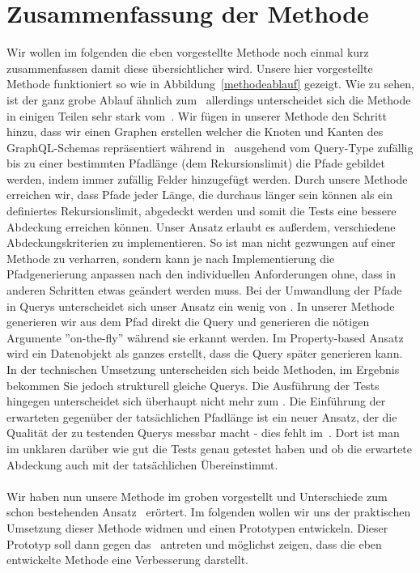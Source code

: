 \section{Zusammenfassung der Methode}

Wir wollen im folgenden die eben vorgestellte Methode noch einmal kurz zusammenfassen damit diese übersichtlicher wird.
Unsere hier vorgestellte Methode funktioniert so wie in Abbildung~\ref{methodeablauf} gezeigt.
Wie zu sehen, ist der ganz grobe Ablauf ähnlich zum~\cite[Property-based Testing]{property-based-testing} allerdings unterscheidet sich die
Methode in einigen Teilen sehr stark vom~\cite[Property-based Testing]{property-based-testing}.
Wir fügen in unserer Methode den Schritt hinzu, dass wir einen Graphen erstellen welcher die Knoten und Kanten des GraphQL-Schemas repräsentiert
während in~\cite[Property-based Testing]{property-based-testing} ausgehend vom Query-Type zufällig bis zu einer bestimmten Pfadlänge (dem Rekursionslimit)
die Pfade gebildet werden, indem immer zufällig Felder hinzugefügt werden.
Durch unsere Methode erreichen wir, dass Pfade jeder Länge, die durchaus länger sein können als ein definiertes Rekursionslimit, abgedeckt werden und
somit die Tests eine bessere Abdeckung erreichen können.
Unser Ansatz erlaubt es außerdem, verschiedene Abdeckungskriterien zu implementieren.
So ist man nicht gezwungen auf einer Methode zu verharren, sondern kann je nach Implementierung die Pfadgenerierung anpassen nach den individuellen
Anforderungen ohne, dass in anderen Schritten etwas geändert werden muss.
Bei der Umwandlung der Pfade in Querys unterscheidet sich unser Ansatz ein wenig von \cite[Property-based Testing]{property-based-testing}.
In unserer Methode generieren wir aus dem Pfad direkt die Query und generieren die nötigen Argumente ''on-the-fly'' während sie erkannt werden.
Im Property-based Ansatz wird ein Datenobjekt als ganzes erstellt, dass die Query später generieren kann.
In der technischen Umsetzung unterscheiden sich beide Methoden, im Ergebnis bekommen Sie jedoch strukturell gleiche Querys.
Die Ausführung der Tests hingegen unterscheidet sich überhaupt nicht mehr zum \cite[Property-based Testing]{property-based-testing}.
Die Einführung der erwarteten gegenüber der tatsächlichen Pfadlänge ist ein neuer Ansatz, der die Qualität der zu testenden Querys
messbar macht - dies fehlt im~\cite[Property-based Testing]{property-based-testing}.
Dort ist man im unklaren darüber wie gut die Tests genau getestet haben und ob die erwartete Abdeckung auch mit der tatsächlichen Übereinstimmt.
\\
\\
Wir haben nun unsere Methode im groben vorgestellt und Unterschiede zum schon bestehenden Ansatz~\cite[Property-based Testing]{property-based-testing} erörtert.
Im folgenden wollen wir uns der praktischen Umsetzung dieser Methode widmen und einen Prototypen entwickeln.
Dieser Prototyp soll dann gegen das~\cite[Property-based Testing Tool]{property-based-testing} antreten und möglichst zeigen, dass die eben entwickelte Methode
eine Verbesserung darstellt.







